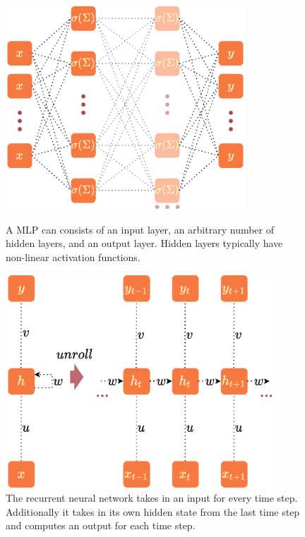 \documentclass[a4paper,cleardoubleempty,BCOR1cm, 11pt]{report}
\begin{document}
\begin{figure}
	\centering
	\begin{minipage}[t]{0.45\textwidth}
		\centering
		\includegraphics[width=0.8\textwidth,height=0.21\textheight]{images/mlp.pdf} 
		\caption{A MLP can consists of an input layer, an arbitrary number of hidden layers, and an output layer. Hidden layers typically have non-linear activation functions.}
	\end{minipage}\hfill
	\begin{minipage}[t]{0.45\textwidth}
		\centering
		\includegraphics[width=0.9\textwidth,height=0.20\textheight]{images/rnn.pdf}
		\caption{The recurrent neural network takes in an input for every time step. Additionally it takes in its own hidden state from the last time step and computes an output for each time step.}
		\label{fig:rnn}
	\end{minipage}
\end{figure}
\end{document}
